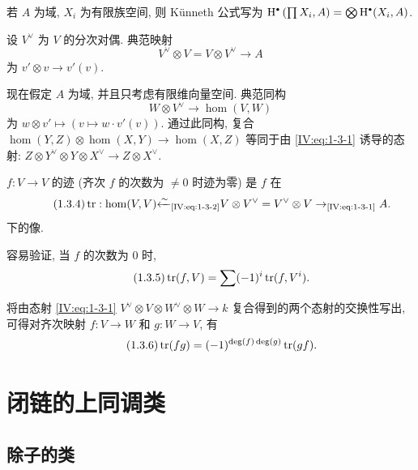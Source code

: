 若 $A$ 为域, $X_i$ 为有限族空间, 则 K\"unneth 公式写为
$\h^\bullet\left(\prod X_i,A\right) = \bigotimes \h^\bullet(X_i,A)$.

设 $V^\vee$ 为 $V$ 的分次对偶. 典范映射
\begin{equation*}\tag{1.3.1}\label{IV:eq:1-3-1}
  V^\vee\otimes V = V\otimes V^\vee \to A
\end{equation*}
为 $v'\otimes v\to v'(v)$.

现在假定 $A$ 为域, 并且只考虑有限维向量空间. 典范同构
\begin{equation*}\tag{1.3.2}\label{IV:eq:1-3-2}
  W\otimes V^\vee \to \hom(V,W)
\end{equation*}
为 $w\otimes v'\mapsto \left(v\mapsto w\cdot v'(v)\right)$.
通过此同构, 复合
$\hom(Y,Z)\otimes \hom(X,Y)\to \hom(X,Z)$
等同于由 \eqref{IV:eq:1-3-1} 诱导的态射:
$Z\otimes Y^\vee\otimes Y\otimes X^\vee \to Z\otimes X^\vee$.

$f:V\to V$ 的迹 (齐次 $f$ 的次数为 $\ne 0$ 时迹为零) 是 $f$ 在
\begin{equation*}\tag{1.3.4}\label{IV:eq:1-3-4}
  \operatorname{tr}:\hom(V,V) {\xleftarrow\sim}_\text{\eqref{IV:eq:1-3-2}} V\otimes V^\vee = V^\vee \otimes V \to_\text{\eqref{IV:eq:1-3-1}} A .
\end{equation*}
下的像.

容易验证, 当 $f$ 的次数为 $0$ 时,
\begin{equation*}\tag{1.3.5}\label{IV:eq:1-3-5}
  \operatorname{tr}(f,V) = \sum (-1)^i \operatorname{tr}(f,V^i) \text{.}
\end{equation*}

将由态射 \eqref{IV:eq:1-3-1}
$V^\vee\otimes V\otimes W^\vee\otimes W\to k$
复合得到的两个态射的交换性写出, 可得对齐次映射 $f:V\to W$ 和 $g:W\to V$, 有
\begin{equation*}\tag{1.3.6}\label{IV:eq:1-3-6}
  \operatorname{tr}(f g) = (-1)^{\deg(f)\deg(g)} \operatorname{tr}(g f) \text{.}
\end{equation*}

\section{闭链的上同调类}\label{IV:2}

\subsection{除子的类}\label{IV:2-1}

\subsubsection{}\label{IV:2-1-1}

